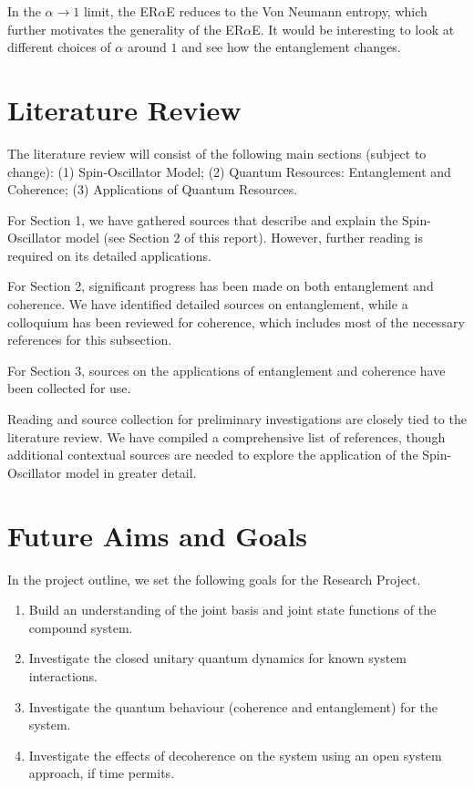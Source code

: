 \documentclass[12pt,a4paper]{article}
\begin{document}
In the $\alpha \to 1$ limit, the ER$\alpha$E reduces to the Von Neumann entropy, which further motivates the generality of the ER$\alpha$E. It would be interesting to look at different choices of $\alpha$ around $1$ and see how the entanglement changes. 


\section{Literature Review}

The literature review will consist of the following main sections (subject to change): (1) Spin-Oscillator Model; (2) Quantum Resources: Entanglement and Coherence; (3) Applications of Quantum Resources.

For Section 1, we have gathered sources that describe and explain the Spin-Oscillator model (see Section 2 of this report). However, further reading is required on its detailed applications.

For Section 2, significant progress has been made on both entanglement and coherence. We have identified detailed sources on entanglement, while a colloquium\cite{C_colloquium} has been reviewed for coherence, which includes most of the necessary references for this subsection.

For Section 3, sources on the applications of entanglement and coherence have been collected for use.

Reading and source collection for preliminary investigations are closely tied to the literature review. We have compiled a comprehensive list of references, though additional contextual sources are needed to explore the application of the Spin-Oscillator model in greater detail.


\section{Future Aims and Goals}

In the project outline, we set the following goals for the Research Project.

\begin{flushleft}
    \begin{enumerate}
        \item Build an understanding of the joint basis and joint state functions of the compound system.
        \item Investigate the closed unitary quantum dynamics for known system interactions.
        \item Investigate the quantum behaviour (coherence and entanglement) for the system.
        \item Investigate the effects of decoherence on the system using an open system approach, if time permits.
    \end{enumerate}
    
\end{flushleft}
\end{document}
